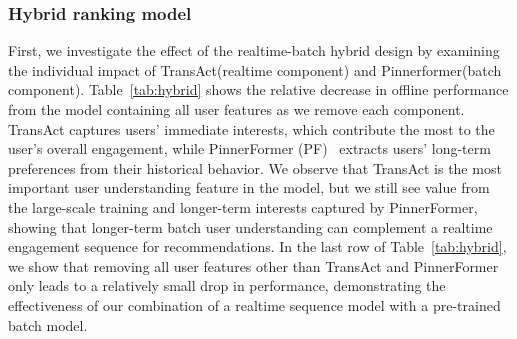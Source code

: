 \subsubsection{Hybrid ranking model}
First, we investigate the effect of the realtime-batch hybrid design by examining the individual impact of TransAct(realtime component) and Pinnerformer(batch component). 
Table~\ref{tab:hybrid} shows the relative decrease in offline performance from the model containing all user features as we remove each component.
TransAct captures users' immediate interests, which contribute the most to the user's overall engagement, while PinnerFormer (PF)~\cite{pinnerformer} extracts users' long-term preferences from their historical behavior.
We observe that TransAct is the most important user understanding feature in the model, but we still see value from the large-scale training and longer-term interests captured by PinnerFormer, showing that longer-term batch user understanding can complement a realtime engagement sequence for recommendations.
In the last row of Table~\ref{tab:hybrid}, we show that removing all user features other than TransAct and PinnerFormer only leads to a relatively small drop in performance, demonstrating the effectiveness of our combination of a realtime sequence model with a pre-trained batch model.







